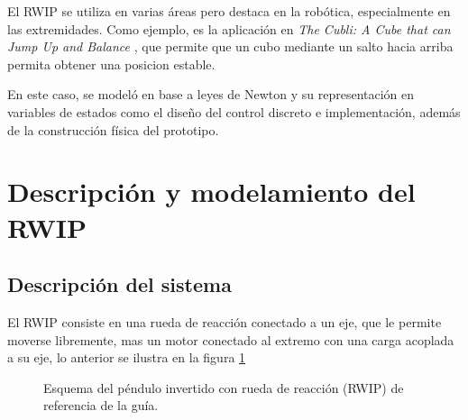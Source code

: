 \documentclass[conference]{IEEEtran}
\begin{document}
El RWIP se utiliza en varias áreas pero destaca en la robótica, especialmente en las extremidades. Como ejemplo, es la aplicación en \textit{The Cubli: A Cube that can Jump Up and Balance} \cite{ref6}, que permite que un cubo mediante un salto hacia arriba permita obtener una posicion estable.

En este caso, se modeló en base a leyes de  Newton y su representación en variables de estados como el diseño del control discreto e implementación, además de la construcción física del prototipo.


\section{Descripción y modelamiento del RWIP}


\subsection{Descripción del sistema}

El RWIP consiste en una rueda de reacción conectado a un eje, que le permite moverse libremente, mas un motor conectado al extremo con una carga acoplada a su eje, lo anterior se ilustra en la figura \ref{fig:pendulo_referencia}

\begin{figure}[htbp]
    \centering
    \caption{Esquema del péndulo invertido con rueda de reacción (RWIP) de referencia de la guía.}
    \label{fig:pendulo_referencia}
\end{figure}
\end{document}
